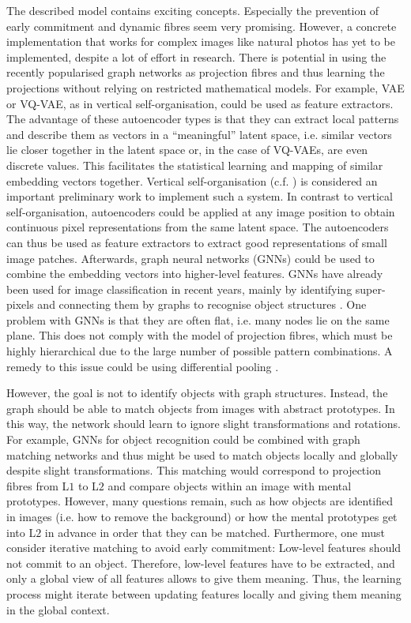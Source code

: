 The described model contains exciting concepts. Especially the prevention of early commitment and dynamic fibres seem very promising. However, a concrete implementation that works for complex images like natural photos has yet to be implemented, despite a lot of effort in research. There is potential in using the recently popularised graph networks as projection fibres and thus learning the projections without relying on restricted mathematical models. For example, VAE or VQ-VAE, as in vertical self-organisation, could be used as feature extractors. The advantage of these autoencoder types is that they can extract local patterns and describe them as vectors in a ``meaningful'' latent space, i.e. similar vectors lie closer together in the latent space or, in the case of VQ-VAEs, are even discrete values. This facilitates the statistical learning and mapping of similar embedding vectors together. Vertical self-organisation (c.f. ) is considered an important preliminary work to implement such a system. In contrast to vertical self-organisation, autoencoders could be applied at any image position to obtain continuous pixel representations from the same latent space. The autoencoders can thus be used as feature extractors to extract good representations of small image patches. Afterwards, graph neural networks (GNNs) could be used to combine the embedding vectors into higher-level features. GNNs have already been used for image classification in recent years, mainly by identifying super-pixels and connecting them by graphs to recognise object structures .  One problem with GNNs is that they are often flat, i.e. many nodes lie on the same plane. This does not comply with the model of projection fibres, which must be highly hierarchical due to the large number of possible pattern combinations. A remedy to this issue could be using differential pooling .

However, the goal is not to identify objects with graph structures. Instead, the graph should be able to match objects from images with abstract prototypes. In this way, the network should learn to ignore slight transformations and rotations. For example, GNNs for object recognition could be combined with graph matching networks  and thus might be used to match objects locally and globally despite slight transformations. This matching would correspond to projection fibres from L$1$ to L$2$ and compare objects within an image with mental prototypes. However, many questions remain, such as how objects are identified in images (i.e. how to remove the background) or how the mental prototypes get into L$2$ in advance in order that they can be matched. Furthermore, one must consider iterative matching to avoid early commitment: Low-level features should not commit to an object. Therefore, low-level features have to be extracted, and only a global view of all features allows to give them meaning. Thus, the learning process might iterate between updating features locally and giving them meaning in the global context.


